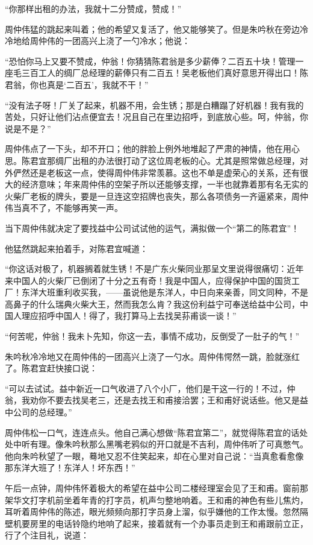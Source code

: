 \par “你那样出租的办法，我就十二分赞成，赞成！”
\par 周仲伟猛的跳起来叫着；他的希望又复活了，他又能够笑了。但是朱吟秋在旁边冷冷地给周仲伟的一团高兴上浇了一勺冷水；他说：
\par “恐怕你马上又要不赞成，仲翁！你猜猜陈君翁是多少薪俸？二百五十块！管理一座毛三百工人的绸厂总经理的薪俸只有二百五！吴老板他们真好意思开得出口！陈君翁，你也真是‘二百五’，我就不干！”
\par “没有法子呀！厂关了起来，机器不用，会生锈；那是白糟蹋了好机器！我有我的苦处，只好让他们沾点便宜去！况且自己在里边招呼，到底放心些。呵，仲翁，你说是不是？”
\par 周仲伟点了一下头，却不开口；他的胖脸上例外地堆起了严肃的神情，他在用心思。陈君宜那绸厂出租的办法很打动了这位周老板的心。尤其是照常做总经理，对外俨然还是老板这一点，使得周仲伟非常羡慕。这也不单是虚荣心的关系，还有很大的经济意味；年来周仲伟的空架子所以还能够支撑，一半也就靠着那有名无实的火柴厂老板的牌头，要是一旦连这空招牌也丧失，那么各项债务一齐逼紧来，周仲伟当真不了，不能够再笑一声。
\par 当下周仲伟就决定了要找益中公司试试他的运气，满拟做一个“第二的陈君宜”！
\par 他猛然跳起来拍着手，对陈君宜喊道：
\par “你这话对极了，机器搁着就生锈！不是广东火柴同业那呈文里说得很痛切：近年来中国人的火柴厂已倒闭了十分之五有奇！我是中国人，应得保护中国的国货工厂！东洋大班重利收买我，——虽说他是东洋人，中日向来亲善，同文同种，不是高鼻子的什么瑞典火柴大王，然而我怎么肯？我这份利益宁可奉送给益中公司，中国人理应招呼中国人！得了，我打算马上去找吴荪甫谈一谈！”
\par “何苦呢，仲翁！我未卜先知，你这一去，事情不成功，反倒受了一肚子的气！”
\par 朱吟秋冷冷地又在周仲伟的一团高兴上浇了一勺水。周仲伟愕然一跳，脸就涨红了。陈君宜赶快接口说：
\par “可以去试试。益中新近一口气收进了八个小厂，他们是干这一行的！不过，仲翁，我劝你不要去找吴老三，还是去找王和甫接洽罢；王和甫好说话些。他又是益中公司的总经理。”
\par 周仲伟松一口气，连连点头。他自己满心想做“陈君宜第二”，就觉得陈君宜的话处处中听有理。像朱吟秋那么黑嘴老鸦似的开口就是不吉利，周仲伟听了可真憋气。他向朱吟秋望了一眼，蓦地又忍不住笑起来，却在心里对自己说：“当真愈看愈像那东洋大班了！东洋人！坏东西！”
\par 午后一点钟，周仲伟怀着极大的希望在益中公司二楼经理室会见了王和甫。窗前那架华文打字机前坐着年青的打字员，机声匀整地响着。王和甫的神色有些儿焦灼，耳听着周仲伟的陈述，眼光频频向那打字员身上溜，似乎嫌他的工作太慢。忽然隔壁机要房里的电话铃隐约地响了起来，接着就有一个办事员走到王和甫跟前立正，行了个注目礼，说道：
